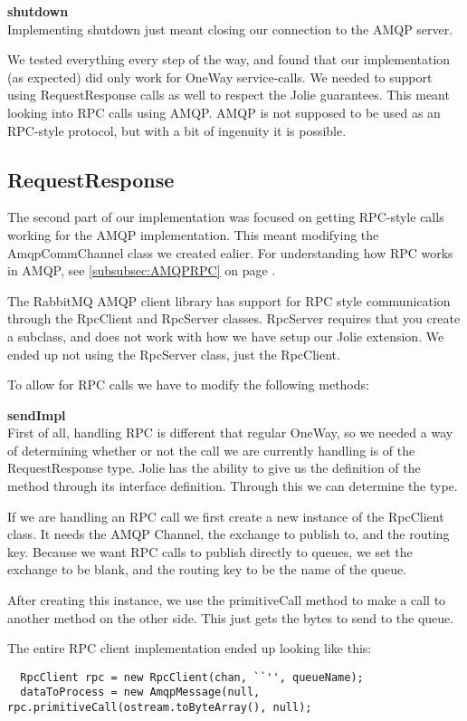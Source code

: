 \noindent\textbf{shutdown}\\
Implementing shutdown just meant closing our connection to the AMQP server.

We tested everything every step of the way, and found that our implementation (as expected) did only work for OneWay service-calls. We needed to support using RequestResponse calls as well to respect the Jolie guarantees. This meant looking into RPC calls using AMQP. AMQP is not supposed to be used as an RPC-style protocol, but with a bit of ingenuity it is possible.

\subsection{RequestResponse}
The second part of our implementation was focused on getting RPC-style calls working for the AMQP implementation. This meant modifying the AmqpCommChannel class we created ealier. For understanding how RPC works in AMQP, see \ref{subsubsec:AMQPRPC} on page \pageref{subsubsec:AMQPRPC}.

The RabbitMQ AMQP client library has support for RPC style communication through the RpcClient and RpcServer classes. RpcServer requires that you create a subclass, and does not work with how we have setup our Jolie extension. We ended up not using the RpcServer class, just the RpcClient.

To allow for RPC calls we have to modify the following methods:

\noindent\textbf{sendImpl}\\
First of all, handling RPC is different that regular OneWay, so we needed a way of determining whether or not the call we are currently handling is of the RequestResponse type. Jolie has the ability to give us the definition of the method through its interface definition. Through this we can determine the type.

If we are handling an RPC call we first create a new instance of the RpcClient class. It needs the AMQP Channel, the exchange to publish to, and the routing key. Because we want RPC calls to publish directly to queues, we set the exchange to be blank, and the routing key to be the name of the queue.

After creating this instance, we use the primitiveCall method to make a call to another method on the other side. This just gets the bytes to send to the queue.

The entire RPC client implementation ended up looking like this:
\begin{lstlisting}
  RpcClient rpc = new RpcClient(chan, ``'', queueName);
  dataToProcess = new AmqpMessage(null, rpc.primitiveCall(ostream.toByteArray(), null);
\end{lstlisting}

